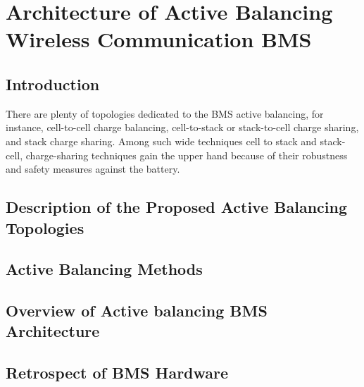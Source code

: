 \chapter{Architecture of Active Balancing Wireless Communication BMS}\label{ch:Architecture_Active_Balancing_BMS}
\section{Introduction}
There are plenty of topologies dedicated to the BMS active balancing, for instance, cell-to-cell charge balancing, cell-to-stack or stack-to-cell charge sharing, and stack charge sharing. Among such wide techniques cell to stack and stack-cell, charge-sharing techniques gain the upper hand because of their robustness and safety measures against the battery.
\section{Description of the Proposed Active Balancing Topologies}
\section{Active Balancing Methods}
\section{Overview of Active balancing BMS Architecture}
\section{Retrospect of BMS Hardware}




